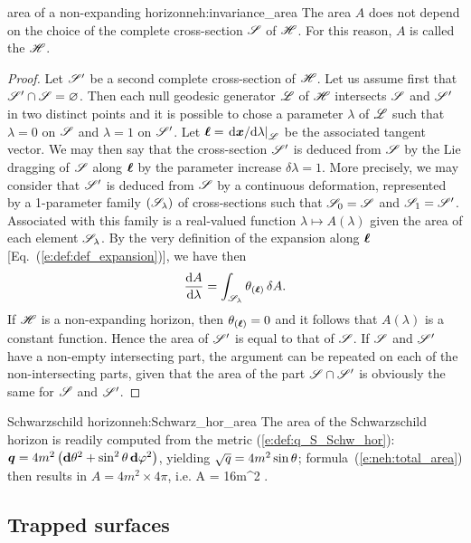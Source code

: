 \begin{tprop}{area of a non-expanding horizon}{neh:invariance_area}
The area $A$ does not depend on the choice of the complete cross-section $\mathscr{S}$
of $\mathscr{H}$.
For this reason, $A$ is
called the 
$\mathscr{H}$.
\end{tprop}

\begin{proof}
Let $\mathscr{S}'$ be a second complete cross-section of $\mathscr{H}$. Let us assume first that
$\mathscr{S}'\cap\mathscr{S} = \varnothing$. Then each null geodesic generator $\mathscr{L}$ of $\mathscr{H}$ intersects
$\mathscr{S}$ and $\mathscr{S}'$ in two distinct points and it is possible to chose a parameter
$\lambda$ of $\mathscr{L}$ such that $\lambda=0$ on $\mathscr{S}$ and $\lambda=1$ on $\mathscr{S}'$.
Let $\bm{\ell} = \left. \mathrm{d}\bm{x}/\mathrm{d}\lambda \right| _{\mathscr{L}}$ be the associated tangent vector.
We may then say that the cross-section $\mathscr{S}'$ is deduced
from $\mathscr{S}$ by the Lie dragging of $\mathscr{S}$ along $\bm{\ell}$ by the parameter increase $\delta\lambda=1$.
More precisely, we may consider that $\mathscr{S}'$ is deduced from $\mathscr{S}$ by a
continuous deformation, represented by a 1-parameter family $(\mathscr{S}_{\lambda})$
of cross-sections such that $\mathscr{S}_0 = \mathscr{S}$ and $\mathscr{S}_1 = \mathscr{S}'$. Associated
with this family is a real-valued function $\lambda \mapsto A(\lambda)$
given the area of each element $\mathscr{S}_{\lambda}$. By the very definition
of the expansion along $\bm{\ell}$ [Eq.~(\ref{e:def:def_expansion})], we have then
\[
    \frac{\mathrm{d} A}{\mathrm{d}\lambda} = \int_{\mathscr{S}_{\lambda}} \theta_{(\bm{\ell})} \, \delta A .
\]
If $\mathscr{H}$ is a non-expanding horizon, then $\theta_{(\bm{\ell})}=0$ and it follows
that $A(\lambda)$ is a constant function. Hence the area of $\mathscr{S}'$ is equal
to that of $\mathscr{S}$. If $\mathscr{S}$ and $\mathscr{S}'$ have a non-empty intersecting part,
the argument can be repeated on each of the non-intersecting parts, given
that the area of the part $\mathscr{S}\cap\mathscr{S}'$ is obviously the same for $\mathscr{S}$
and $\mathscr{S}'$.
\end{proof}

\begin{texample}{Schwarzschild horizon}{neh:Schwarz_hor_area}
The area of the Schwarzschild horizon is readily computed from
the metric (\ref{e:def:q_S_Schw_hor}):
$\bm{q} = 4m^2 \left( \mathbf{d}\theta^2 + \sin^2\theta \, \mathbf{d}\varphi^2 \right)$, yielding
$\sqrt{q}=4m^2 \sin\theta$; formula~(\ref{e:neh:total_area}) then
results in $A = 4 m^2 \times 4\pi$, i.e.
\be \label{e:neh:area_Schwarz}
     A = 16\pi m^2 .
\ee
\end{texample}

\subsection{Trapped surfaces} \label{s:neh:trapped_surfaces}

